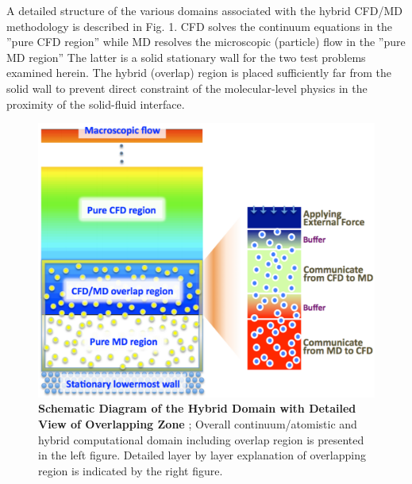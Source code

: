 \documentclass[preprint,12pt]{elsarticle}
\begin{document}
A detailed structure of the various domains associated with the hybrid CFD/MD methodology is described in Fig. 1. CFD solves the continuum equations in the ''pure CFD region'' while MD resolves the microscopic (particle) flow in the ''pure MD region'' The latter is a solid stationary wall for the two test problems examined herein. The hybrid (overlap) region is placed sufficiently far from the solid wall to prevent direct constraint of the molecular-level physics in the proximity of the solid-fluid interface. 

\begin{figure}
\centering
\includegraphics[width=0.8\linewidth]{Hybrid_Schematic.pdf}
\vskip-0.2cm
\caption{\small 
{\bf Schematic Diagram of the Hybrid Domain with Detailed View of Overlapping Zone}
; Overall continuum/atomistic and hybrid computational domain including 
overlap region is presented in the left figure. Detailed layer by layer 
explanation of overlapping region is indicated by the right figure.
}
\label{Fig:Couette}
\vspace{-1em}
\end{figure}
\end{document}
